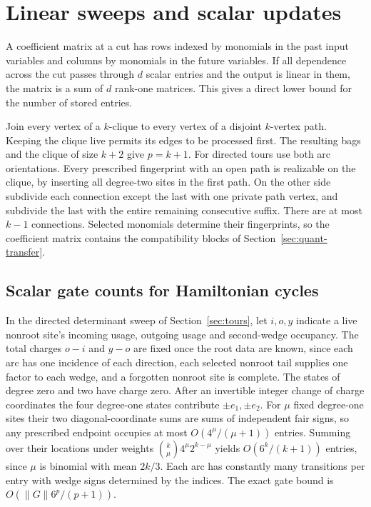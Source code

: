 \documentclass[11pt]{article}
\theoremstyle{definition}
\begin{document}
\section{Linear sweeps and scalar updates}\label{sec:frontiers}

A coefficient matrix at a cut has rows indexed by monomials in the past input variables and columns by monomials in the future variables. If all dependence across the cut passes through \(d\) scalar entries and the output is linear in them, the matrix is a sum of \(d\) rank-one matrices. This gives a direct lower bound for the number of stored entries.

Join every vertex of a \(k\)-clique to every vertex of a disjoint \(k\)-vertex path. Keeping the clique live permits its edges to be processed first. The resulting bags and the clique of size \(k+2\) give \(p=k+1\). For directed tours use both arc orientations. Every prescribed fingerprint with an open path is realizable on the clique, by inserting all degree-two sites in the first path. On the other side subdivide each connection except the last with one private path vertex, and subdivide the last with the entire remaining consecutive suffix. There are at most \(k-1\) connections. Selected monomials determine their fingerprints, so the coefficient matrix contains the compatibility blocks of Section~\ref{sec:quant-transfer}.

\subsection{Scalar gate counts for Hamiltonian cycles}

In the directed determinant sweep of Section~\ref{sec:tours}, let \(i,o,y\) indicate a live nonroot site's incoming usage, outgoing usage and second-wedge occupancy. The total charges \(o-i\) and \(y-o\) are fixed once the root data are known, since each arc has one incidence of each direction, each selected nonroot tail supplies one factor to each wedge, and a forgotten nonroot site is complete. The states of degree zero and two have charge zero. After an invertible integer change of charge coordinates the four degree-one states contribute \(\pm e_1,\pm e_2\). For \(\mu\) fixed degree-one sites their two diagonal-coordinate sums are sums of independent fair signs, so any prescribed endpoint occupies at most \(O(4^\mu/(\mu+1))\) entries. Summing over their locations under weights \(\binom k\mu4^\mu2^{k-\mu}\) yields \(O(6^k/(k+1))\) entries, since \(\mu\) is binomial with mean \(2k/3\). Each arc has constantly many transitions per entry with wedge signs determined by the indices. The exact gate bound is \(O(\|G\|6^p/(p+1))\).
\end{document}

